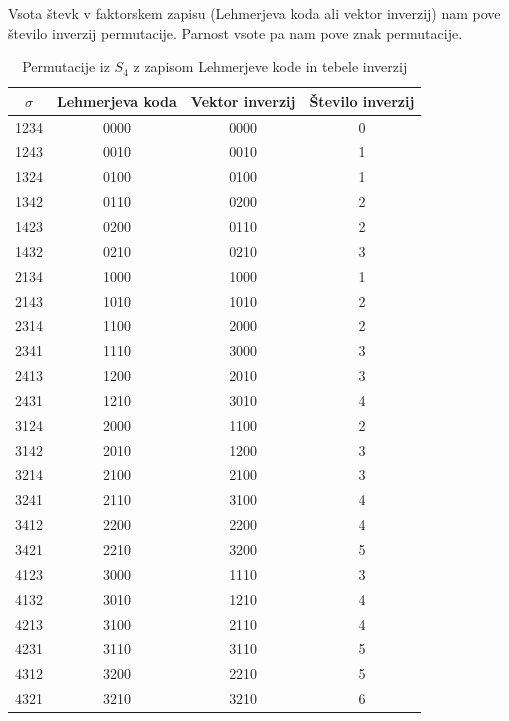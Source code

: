 \documentclass[a4paper, 12pt]{book}
\begin{document}
Vsota števk v faktorskem zapisu (Lehmerjeva koda ali vektor inverzij) nam pove število inverzij permutacije. Parnost vsote pa nam pove znak permutacije.
\begin{table}
    \begin{center}
        \begin{tabular}{ |c|c|c|c| } 
        \hline
            $\sigma$ & Lehmerjeva koda & Vektor inverzij & Število inverzij \\ 
        \hline
            1234 & 0000 & 0000 & 0 \\ 
        \hline
            1243 & 0010 & 0010 & 1 \\ 
        \hline
            1324 & 0100 & 0100 & 1 \\ 
        \hline
            1342 & 0110 & 0200 & 2 \\ 
        \hline
            1423 & 0200 & 0110 & 2 \\ 
        \hline
            1432 & 0210 & 0210 & 3 \\ 
        \hline
            2134 & 1000 & 1000 & 1 \\ 
        \hline
            2143 & 1010 & 1010 & 2 \\ 
        \hline
            2314 & 1100 & 2000 & 2 \\ 
        \hline
            2341 & 1110 & 3000 & 3 \\ 
        \hline
            2413 & 1200 & 2010 & 3 \\ 
        \hline
            2431 & 1210 & 3010 & 4 \\ 
        \hline
            3124 & 2000 & 1100 & 2 \\ 
        \hline
            3142 & 2010 & 1200 & 3 \\ 
        \hline
            3214 & 2100 & 2100 & 3 \\ 
        \hline
            3241 & 2110 & 3100 & 4 \\ 
        \hline
            3412 & 2200 & 2200 & 4 \\ 
        \hline
            3421 & 2210 & 3200 & 5 \\ 
        \hline
            4123 & 3000 & 1110 & 3 \\ 
        \hline
            4132 & 3010 & 1210 & 4 \\ 
        \hline
            4213 & 3100 & 2110 & 4 \\ 
        \hline
            4231 & 3110 & 3110 & 5 \\ 
        \hline
            4312 & 3200 & 2210 & 5 \\ 
        \hline
            4321 & 3210 & 3210 & 6 \\ 
        \hline
        \end{tabular}
    \end{center}
    \caption{ Permutacije iz $S_4$ z zapisom Lehmerjeve kode in tebele inverzij }
    \label{tbl:permutacije4vektorji}
\end{table}
\end{document}
